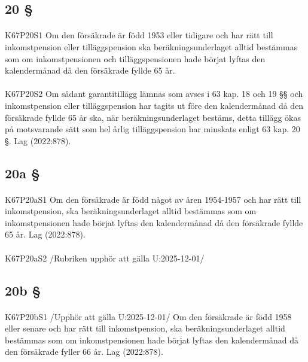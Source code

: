 \documentclass[a4paper,notitlepage,openany,10pt]{book}
\begin{document}
\subsection*{20 §}
\paragraph*{}
{\tiny K67P20S1}
Om den försäkrade är född 1953 eller tidigare och har rätt till inkomstpension eller tilläggspension ska beräkningsunderlaget alltid bestämmas som om inkomstpensionen och tilläggspensionen hade börjat lyftas den kalendermånad då den försäkrade fyllde 65 år.
\paragraph*{}
{\tiny K67P20S2}
Om sådant garantitillägg lämnas som avses i 63 kap. 18 och 19 §§ och inkomstpension eller tilläggspension har tagits ut före den kalendermånad då den försäkrade fyllde 65 år ska, när beräkningsunderlaget bestäms, detta tillägg ökas på motsvarande sätt som hel årlig tilläggspension har minskats enligt 63 kap. 20 §.
Lag (2022:878).
\subsection*{20a §}
\paragraph*{}
{\tiny K67P20aS1}
Om den försäkrade är född något av åren 1954-1957 och har rätt till inkomstpension, ska beräkningsunderlaget alltid bestämmas som om inkomstpensionen hade börjat lyftas den kalendermånad då den försäkrade fyllde 65 år.
Lag (2022:878).
\paragraph*{}
{\tiny K67P20aS2}
/Rubriken upphör att gälla U:2025-12-01/
\subsection*{20b §}
\paragraph*{}
{\tiny K67P20bS1}
/Upphör att gälla U:2025-12-01/
Om den försäkrade är född 1958 eller senare och har rätt till inkomstpension, ska beräkningsunderlaget alltid bestämmas som om inkomstpensionen hade börjat lyftas den kalendermånad då den försäkrade fyller 66 år.
Lag (2022:878).
\end{document}
